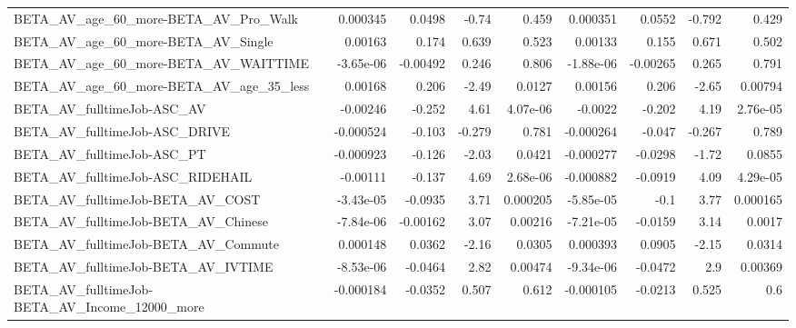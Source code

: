 \begin{tabular}{lrrrrrrrr}
BETA\_AV\_age\_60\_more-BETA\_AV\_Pro\_Walk               &    0.000345 &       0.0498 &    -0.74 &    0.459 &   0.000351 &      0.0552 &       -0.792 &         0.429 \\
BETA\_AV\_age\_60\_more-BETA\_AV\_Single                 &     0.00163 &        0.174 &    0.639 &    0.523 &    0.00133 &       0.155 &        0.671 &         0.502 \\
BETA\_AV\_age\_60\_more-BETA\_AV\_WAITTIME               &   -3.65e-06 &     -0.00492 &    0.246 &    0.806 &  -1.88e-06 &    -0.00265 &        0.265 &         0.791 \\
BETA\_AV\_age\_60\_more-BETA\_AV\_age\_35\_less            &     0.00168 &        0.206 &    -2.49 &   0.0127 &    0.00156 &       0.206 &        -2.65 &       0.00794 \\
BETA\_AV\_fulltimeJob-ASC\_AV                         &    -0.00246 &       -0.252 &     4.61 & 4.07e-06 &    -0.0022 &      -0.202 &         4.19 &      2.76e-05 \\
BETA\_AV\_fulltimeJob-ASC\_DRIVE                      &   -0.000524 &       -0.103 &   -0.279 &    0.781 &  -0.000264 &      -0.047 &       -0.267 &         0.789 \\
BETA\_AV\_fulltimeJob-ASC\_PT                         &   -0.000923 &       -0.126 &    -2.03 &   0.0421 &  -0.000277 &     -0.0298 &        -1.72 &        0.0855 \\
BETA\_AV\_fulltimeJob-ASC\_RIDEHAIL                   &    -0.00111 &       -0.137 &     4.69 & 2.68e-06 &  -0.000882 &     -0.0919 &         4.09 &      4.29e-05 \\
BETA\_AV\_fulltimeJob-BETA\_AV\_COST                   &   -3.43e-05 &      -0.0935 &     3.71 & 0.000205 &  -5.85e-05 &        -0.1 &         3.77 &      0.000165 \\
BETA\_AV\_fulltimeJob-BETA\_AV\_Chinese                &   -7.84e-06 &     -0.00162 &     3.07 &  0.00216 &  -7.21e-05 &     -0.0159 &         3.14 &        0.0017 \\
BETA\_AV\_fulltimeJob-BETA\_AV\_Commute                &    0.000148 &       0.0362 &    -2.16 &   0.0305 &   0.000393 &      0.0905 &        -2.15 &        0.0314 \\
BETA\_AV\_fulltimeJob-BETA\_AV\_IVTIME                 &   -8.53e-06 &      -0.0464 &     2.82 &  0.00474 &  -9.34e-06 &     -0.0472 &          2.9 &       0.00369 \\
BETA\_AV\_fulltimeJob-BETA\_AV\_Income\_12000\_more      &   -0.000184 &      -0.0352 &    0.507 &    0.612 &  -0.000105 &     -0.0213 &        0.525 &           0.6 \\

\end{tabular}
